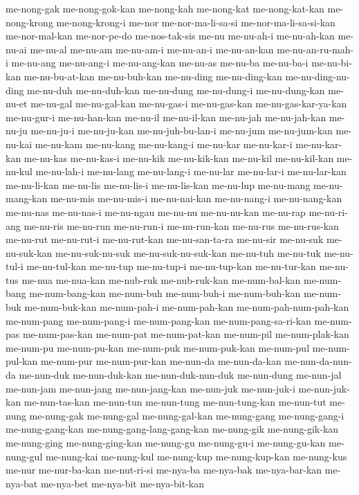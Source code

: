 {me-nong-gak me-nong-gok-kan me-nong-kah me-nong-kat me-nong-kat-kan
me-nong-krong me-nong-krong-i me-nor me-nor-ma-li-sa-si
me-nor-ma-li-sa-si-kan me-nor-mal-kan me-nor-pe-do me-nos-tak-sis me-nu
me-nu-ah-i me-nu-ah-kan me-nu-ai me-nu-al me-nu-am me-nu-am-i me-nu-an-i
me-nu-an-kan me-nu-an-ru-mah-i me-nu-ang me-nu-ang-i me-nu-ang-kan
me-nu-as me-nu-ba me-nu-ba-i me-nu-bi-kan me-nu-bu-at-kan me-nu-buh-kan
me-nu-ding me-nu-ding-kan me-nu-ding-nu-ding me-nu-duh me-nu-duh-kan
me-nu-dung me-nu-dung-i me-nu-dung-kan me-nu-et me-nu-gal me-nu-gal-kan
me-nu-gas-i me-nu-gas-kan me-nu-gas-kar-ya-kan me-nu-gur-i me-nu-han-kan
me-nu-il me-nu-il-kan me-nu-jah me-nu-jah-kan me-nu-ju me-nu-ju-i
me-nu-ju-kan me-nu-juh-bu-lan-i me-nu-jum me-nu-jum-kan me-nu-kai
me-nu-kam me-nu-kang me-nu-kang-i me-nu-kar me-nu-kar-i me-nu-kar-kan
me-nu-kas me-nu-kas-i me-nu-kik me-nu-kik-kan me-nu-kil me-nu-kil-kan
me-nu-kul me-nu-lah-i me-nu-lang me-nu-lang-i me-nu-lar me-nu-lar-i
me-nu-lar-kan me-nu-li-kan me-nu-lis me-nu-lis-i me-nu-lis-kan me-nu-lup
me-nu-mang me-nu-mang-kan me-nu-mis me-nu-mis-i me-nu-nai-kan me-nu-nang-i
me-nu-nang-kan me-nu-nas me-nu-nas-i me-nu-ngau me-nu-nu me-nu-nu-kan
me-nu-rap me-nu-ri-ang me-nu-ris me-nu-run me-nu-run-i me-nu-run-kan
me-nu-rus me-nu-rus-kan me-nu-rut me-nu-rut-i me-nu-rut-kan
me-nu-san-ta-ra me-nu-sir me-nu-suk me-nu-suk-kan me-nu-suk-nu-suk
me-nu-suk-nu-suk-kan me-nu-tuh me-nu-tuk me-nu-tul-i me-nu-tul-kan
me-nu-tup me-nu-tup-i me-nu-tup-kan me-nu-tur-kan me-nu-tus me-nua
me-nua-kan me-nub-ruk me-nub-ruk-kan me-num-bal-kan me-num-bang
me-num-bang-kan me-num-buh me-num-buh-i me-num-buh-kan me-num-buk
me-num-buk-kan me-num-pah-i me-num-pah-kan me-num-pah-num-pah-kan
me-num-pang me-num-pang-i me-num-pang-kan me-num-pang-sa-ri-kan me-num-pas
me-num-pas-kan me-num-pat me-num-pat-kan me-num-pil me-num-plak-kan
me-num-pu me-num-pu-kan me-num-puk me-num-puk-kan me-num-pul
me-num-pul-kan me-num-pur me-num-pur-kan me-nun-da me-nun-da-kan
me-nun-da-nun-da me-nun-duk me-nun-duk-kan me-nun-duk-nun-duk me-nun-dung
me-nun-jal me-nun-jam me-nun-jang me-nun-jang-kan me-nun-juk me-nun-juk-i
me-nun-juk-kan me-nun-tas-kan me-nun-tun me-nun-tung me-nun-tung-kan
me-nun-tut me-nung me-nung-gak me-nung-gal me-nung-gal-kan me-nung-gang
me-nung-gang-i me-nung-gang-kan me-nung-gang-lang-gang-kan me-nung-gik
me-nung-gik-kan me-nung-ging me-nung-ging-kan me-nung-gu me-nung-gu-i
me-nung-gu-kan me-nung-gul me-nung-kai me-nung-kul me-nung-kup
me-nung-kup-kan me-nung-kus me-nur me-nur-ba-kan me-nut-ri-si me-nya-ba
me-nya-bak me-nya-bar-kan me-nya-bat me-nya-bet me-nya-bit me-nya-bit-kan
}
